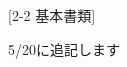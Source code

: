 \newpage
\pagestyle{leaflet}
[2-2 基本書類]
\begin{multicols*}{2}
\begin{center}
    {\selectsize{13pt}{13pt}5/20に追記します}
\end{center}
\end{multicols*}